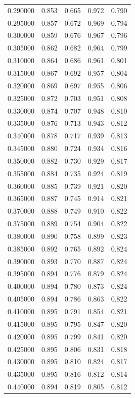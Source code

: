 \begin{table}[htbp]
\begin{tabular}{lllll}
0.290000 & 0.853 & 0.665 & 0.972 & 0.790 \\
0.295000 & 0.857 & 0.672 & 0.969 & 0.794 \\
0.300000 & 0.859 & 0.676 & 0.967 & 0.796 \\
0.305000 & 0.862 & 0.682 & 0.964 & 0.799 \\
0.310000 & 0.864 & 0.686 & 0.961 & 0.801 \\
0.315000 & 0.867 & 0.692 & 0.957 & 0.804 \\
0.320000 & 0.869 & 0.697 & 0.955 & 0.806 \\
0.325000 & 0.872 & 0.703 & 0.951 & 0.808 \\
0.330000 & 0.874 & 0.707 & 0.948 & 0.810 \\
0.335000 & 0.876 & 0.713 & 0.943 & 0.812 \\
0.340000 & 0.878 & 0.717 & 0.939 & 0.813 \\
0.345000 & 0.880 & 0.724 & 0.934 & 0.816 \\
0.350000 & 0.882 & 0.730 & 0.929 & 0.817 \\
0.355000 & 0.884 & 0.735 & 0.924 & 0.819 \\
0.360000 & 0.885 & 0.739 & 0.921 & 0.820 \\
0.365000 & 0.887 & 0.745 & 0.914 & 0.821 \\
0.370000 & 0.888 & 0.749 & 0.910 & 0.822 \\
0.375000 & 0.889 & 0.754 & 0.904 & 0.822 \\
0.380000 & 0.890 & 0.758 & 0.899 & 0.823 \\
0.385000 & 0.892 & 0.765 & 0.892 & 0.824 \\
0.390000 & 0.893 & 0.770 & 0.887 & 0.824 \\
0.395000 & 0.894 & 0.776 & 0.879 & 0.824 \\
0.400000 & 0.894 & 0.780 & 0.873 & 0.824 \\
0.405000 & 0.894 & 0.786 & 0.863 & 0.822 \\
0.410000 & 0.895 & 0.791 & 0.854 & 0.821 \\
0.415000 & 0.895 & 0.795 & 0.847 & 0.820 \\
0.420000 & 0.895 & 0.799 & 0.841 & 0.820 \\
0.425000 & 0.895 & 0.806 & 0.831 & 0.818 \\
0.430000 & 0.895 & 0.810 & 0.824 & 0.817 \\
0.435000 & 0.895 & 0.816 & 0.812 & 0.814 \\
0.440000 & 0.894 & 0.819 & 0.805 & 0.812 \\

\end{tabular}
\end{table}
